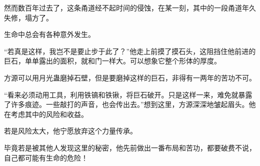 \begin{this_body}
然而数百年过去了，这条甬道经不起时间的侵蚀，在某一刻，其中的一段甬道年久失修，塌方了。

生命中总会有各种意外发生。

“若真是这样，我岂不是要止步于此了？”他走上前摸了摸石头，这阻挡住他前进的巨石，单单露出的面积，就和门一样大。可以想象它整个形体的厚度。

方源可以用月光蛊磨掉石壁，但是要磨掉这样的巨石，非得有一两年的苦功不可。

“看来必须动用工具，利用铁镐和铁锹，将巨石破开。只是这样一来，难免就暴露了许多痕迹。一些敲打的声音，也会传出去。”想到这里，方源深深地皱起眉头。他在考虑其中的风险和收益。

若是风险太大，他宁愿放弃这个力量传承。

毕竟若是被其他人发现这里的秘密，他先前做出一番布局和苦功，都要破费不说，自己都可能有生命的危险！

\end{this_body}

